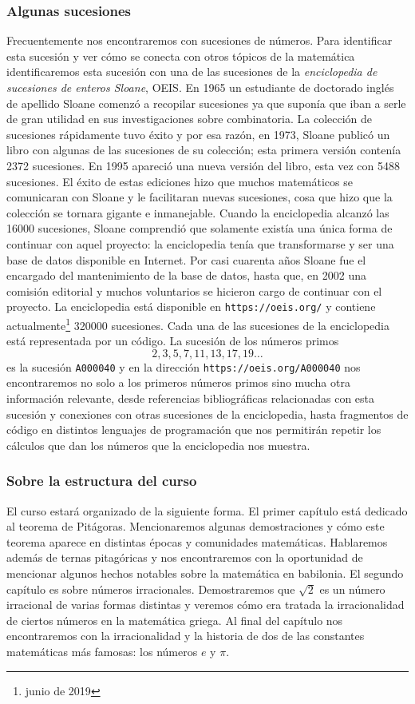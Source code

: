 \subsubsection*{Algunas sucesiones}
Frecuentemente nos encontraremos con sucesiones de números. Para identificar
esta sucesión y ver cómo se conecta con otros tópicos de la matemática
identificaremos esta sucesión con una de las sucesiones de la
\emph{enciclopedia de sucesiones de enteros Sloane}, OEIS. En 1965 un
estudiante de doctorado inglés de apellido Sloane comenzó a recopilar
sucesiones ya que suponía que iban a serle de gran utilidad en sus
investigaciones sobre combinatoria. La colección de sucesiones rápidamente tuvo
éxito y por esa razón, en 1973, Sloane publicó un libro con algunas de las
sucesiones de su colección; esta primera versión contenía 2372 sucesiones. En
1995 apareció una nueva versión del libro, esta vez con 5488 sucesiones. El
éxito de estas ediciones hizo que muchos matemáticos se comunicaran con Sloane
y le facilitaran nuevas sucesiones, cosa que hizo que la colección se tornara
gigante e inmanejable. Cuando la enciclopedia alcanzó las 16000 sucesiones,
Sloane comprendió que solamente existía una única forma de continuar con aquel
proyecto: la enciclopedia tenía que transformarse y ser una base de datos
disponible en Internet. Por casi cuarenta años Sloane fue el encargado del
mantenimiento de la base de datos, hasta que, en 2002 una comisión editorial y
muchos voluntarios se hicieron cargo de continuar con el proyecto. La
enciclopedia está disponible en \verb+https://oeis.org/+ y contiene
actualmente\footnote{junio de 2019} 320000 sucesiones. Cada una de las
sucesiones de la enciclopedia está representada por un código. La sucesión de
los números primos
\[
	2,3,5,7,11,13,17,19\dots
\]
es la sucesión \verb+A000040+ y en la dirección \verb+https://oeis.org/A000040+
nos encontraremos no solo a los primeros números primos sino mucha otra
información relevante, desde referencias bibliográficas relacionadas con esta
sucesión y conexiones con otras sucesiones de la enciclopedia, hasta fragmentos
de código en distintos lenguajes de programación que nos permitirán repetir los
cálculos que dan los números que la enciclopedia nos muestra. 


\subsubsection*{Sobre la estructura del curso}

El curso estará organizado de la siguiente forma.  El primer capítulo está
dedicado al teorema de Pitágoras. Mencionaremos algunas demostraciones y cómo
este teorema aparece en distintas épocas y comunidades matemáticas. Hablaremos
además de ternas pitagóricas y nos encontraremos con la oportunidad de
mencionar algunos hechos notables sobre la matemática en babilonia.  El segundo
capítulo es sobre números irracionales. Demostraremos que $\sqrt{2}$ es un
número irracional de varias formas distintas y veremos cómo era tratada la
irracionalidad de ciertos números en la matemática griega. Al final del
capítulo nos encontraremos con la irracionalidad y la historia de dos de las
constantes matemáticas más famosas: los números $e$ y $\pi$. 

